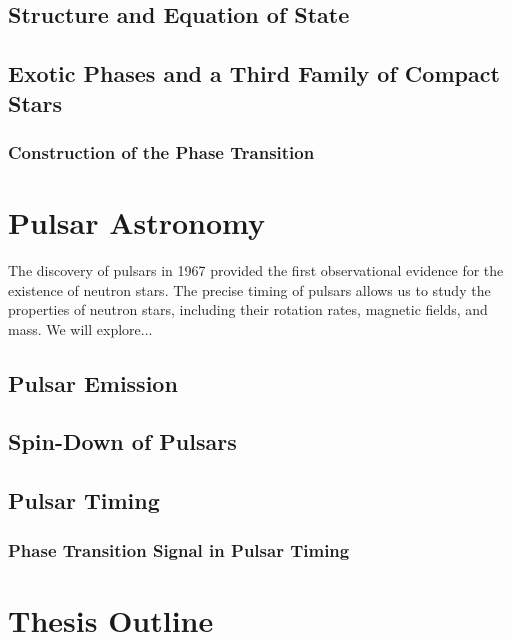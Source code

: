 \documentclass[main.tex]{subfiles}
\begin{document}
    \subsection{Structure and Equation of State}
    \subsection{Exotic Phases and a Third Family of Compact Stars}
    \subsubsection{Construction of the Phase Transition}

    \section{Pulsar Astronomy}\label{sec:ch1:pulsar_astro}
    The discovery of pulsars in 1967 provided the first observational evidence for the existence of neutron stars. The precise timing of pulsars allows us to study the properties of neutron stars, including their rotation rates, magnetic fields, and mass. We will explore...

    \subsection{Pulsar Emission}
    \subsection{Spin-Down of Pulsars}
    \subsection{Pulsar Timing}
    \subsubsection{Phase Transition Signal in Pulsar Timing}

    \section{Thesis Outline}
    
\end{document}
